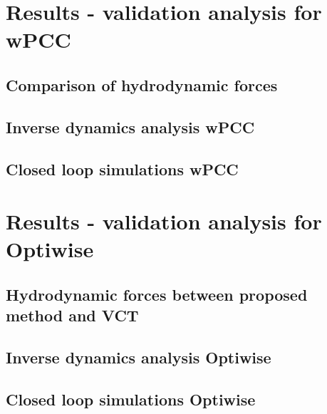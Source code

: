 \documentclass[preprint,11pt,authoryear]{elsarticle}
\begin{document}
\section{Results - validation analysis for wPCC}
\label{sec:results_wpcc}

\FloatBarrier
\subsection{Comparison of hydrodynamic forces}

\FloatBarrier

\subsection{Inverse dynamics analysis wPCC} \label{sec:result_ID_wPCC}

\FloatBarrier
\subsection{Closed loop simulations wPCC}

\FloatBarrier



\section{Results - validation analysis for Optiwise}
\label{sec:results_optiwise}

\FloatBarrier
\subsection{Hydrodynamic forces between proposed method and VCT}


\subsection{Inverse dynamics analysis Optiwise}

\FloatBarrier

\subsection{Closed loop simulations Optiwise}

\FloatBarrier

%
\end{document}
